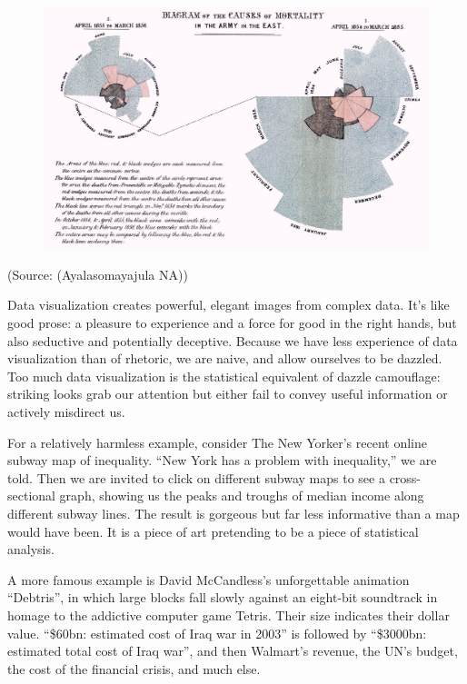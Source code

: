 \documentclass[]{book}
\begin{document}
\begin{figure}
\centering
\includegraphics{images/aya-polar.jpg}
\caption{}
\end{figure}

(Source: (Ayalasomayajula NA))

Data visualization creates powerful, elegant images from complex data.
It's like good prose: a pleasure to experience and a force for good in
the right hands, but also seductive and potentially deceptive. Because
we have less experience of data visualization than of rhetoric, we are
naive, and allow ourselves to be dazzled. Too much data visualization is
the statistical equivalent of dazzle camouflage: striking looks grab our
attention but either fail to convey useful information or actively
misdirect us.

For a relatively harmless example, consider The New Yorker's recent
online subway map of inequality. ``New York has a problem with
inequality,'' we are told. Then we are invited to click on different
subway maps to see a cross-sectional graph, showing us the peaks and
troughs of median income along different subway lines. The result is
gorgeous but far less informative than a map would have been. It is a
piece of art pretending to be a piece of statistical analysis.

A more famous example is David McCandless's unforgettable animation
``Debtris'', in which large blocks fall slowly against an eight-bit
soundtrack in homage to the addictive computer game Tetris. Their size
indicates their dollar value. ``\$60bn: estimated cost of Iraq war in
2003'' is followed by ``\$3000bn: estimated total cost of Iraq war'',
and then Walmart's revenue, the UN's budget, the cost of the financial
crisis, and much else.
\end{document}
